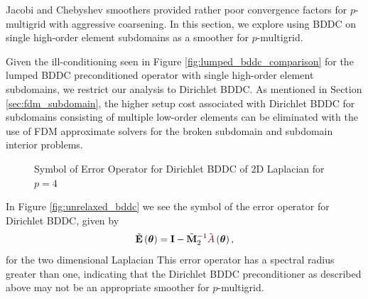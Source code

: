Jacobi and Chebyshev smoothers provided rather poor convergence factors for $p$-multigrid with aggressive coarsening.
In this section, we explore using BDDC on single high-order element subdomains as a smoother for $p$-multigrid.

Given the ill-conditioning seen in Figure \ref{fig:lumped_bddc_comparison} for the lumped BDDC preconditioned operator with single high-order element subdomains, we restrict our analysis to Dirichlet BDDC.
As mentioned in Section \ref{sec:fdm_subdomain}, the higher setup cost associated with Dirichlet BDDC for subdomains consisting of multiple low-order elements can be eliminated with the use of FDM approximate solvers for the broken subdomain and subdomain interior problems.

\begin{figure}[!ht]
  \centering
  \hfill
  \caption{Symbol of Error Operator for Dirichlet BDDC of 2D Laplacian for $p = 4$}
\end{figure}

In Figure \ref{fig:unrelaxed_bddc} we see the symbol of the error operator for Dirichlet BDDC, given by
\begin{equation}
\tilde{\mathbf{E}} \left( \boldsymbol{\theta} \right) = \mathbf{I} - \tilde{\mathbf{M}}_2^{-1} \tilde{{\color{burgundy}A}} \left( \boldsymbol{\theta} \right),
\end{equation}
for the two dimensional Laplacian
This error operator has a spectral radius greater than one, indicating that the Dirichlet BDDC preconditioner as described above may not be an appropriate smoother for $p$-multigrid.

